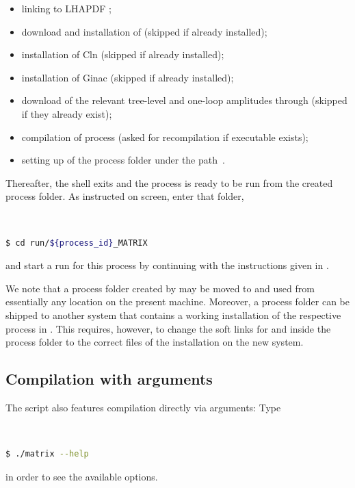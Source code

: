 \documentclass[english,11pt]{article}
\begin{document}
\begin{itemize}
\item linking to {\sc LHAPDF} \cite{Buckley:2014ana};
\item download and installation of \OpenLoops{} \cite{Cascioli:2011va,hepforge:OpenLoops} (skipped if already installed);
\item installation of {\sc Cln} \cite{cln} (skipped if already installed);
\item installation of {\sc Ginac} \cite{Bauer:2000cp} (skipped if already installed);
\item download of the relevant tree-level and one-loop amplitudes through \OpenLoops{} (skipped if they already exist);
\item compilation of \Matrix{} process (asked for recompilation if executable exists);
\item setting up of the \Matrix{} process folder under the path \,.
\end{itemize}
Thereafter, the \Matrix{} shell exits and the process is ready to be run from the created process folder. As instructed 
on screen, enter that folder,
{\tt
\begin{lstlisting}[language=bash]
 $ cd run/${process_id}_MATRIX
\end{lstlisting}
}
and start a run for this process by continuing with the instructions given in .

We note that a process folder created by \Matrix{} may 
be moved to and used from essentially any location on the present machine. 
Moreover, a \Matrix{} process folder can be shipped to another system
that contains a working installation of the respective process in \Matrix{}.
This requires, however, to change the soft links for 
 and  
inside the process folder
to the correct files of the \Matrix{} installation on the new system.


\subsection{Compilation with arguments}

The \Matrix{} script also features compilation directly via arguments: Type
\lstset{basicstyle=\small, frame=none}
{\tt
\begin{lstlisting}[language=bash]
 $ ./matrix --help
\end{lstlisting}
}%
in order to see the available options.
\end{document}
